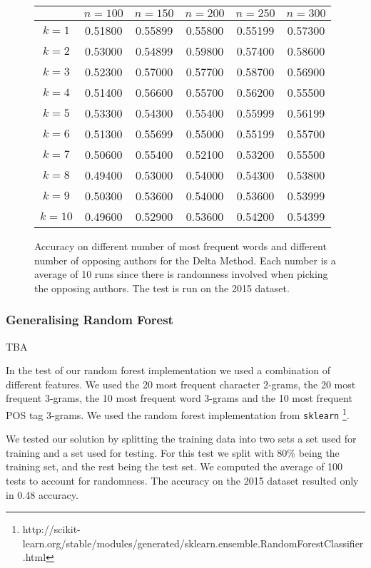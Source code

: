 \begin{figure}
    \centering
    \begin{tabular}{c|ccccc}
               & $n=100$ & $n=150$ & $n=200$ & $n=250$ & $n=300$ \\
        \hline
        $k=1$  & 0.51800 & 0.55899 & 0.55800 & 0.55199 & 0.57300 \\
        $k=2$  & 0.53000 & 0.54899 & 0.59800 & 0.57400 & 0.58600 \\
        $k=3$  & 0.52300 & 0.57000 & 0.57700 & 0.58700 & 0.56900 \\
        $k=4$  & 0.51400 & 0.56600 & 0.55700 & 0.56200 & 0.55500 \\
        $k=5$  & 0.53300 & 0.54300 & 0.55400 & 0.55999 & 0.56199 \\
        $k=6$  & 0.51300 & 0.55699 & 0.55000 & 0.55199 & 0.55700 \\
        $k=7$  & 0.50600 & 0.55400 & 0.52100 & 0.53200 & 0.55500 \\
        $k=8$  & 0.49400 & 0.53000 & 0.54000 & 0.54300 & 0.53800 \\
        $k=9$  & 0.50300 & 0.53600 & 0.54000 & 0.53600 & 0.53999 \\
        $k=10$ & 0.49600 & 0.52900 & 0.53600 & 0.54200 & 0.54399
    \end{tabular}
    \caption{Accuracy on different number of most frequent words and different
        number of opposing authors for the Delta Method. Each number is a
        average of 10 runs since there is randomness involved when picking the
        opposing authors. The test is run on the 2015 dataset.}
    \label{fig:delta_pan_2015_res}
\end{figure}

\subsubsection{Generalising Random Forest}
TBA


In the test of our random forest implementation we used a combination
of different features. We used the 20 most frequent character
2-grams, the 20 most frequent 3-grams, the 10 most frequent
word 3-grams and the 10 most frequent \gls{POS} tag 3-grams.
We used the random forest implementation from \texttt{sklearn}
\footnote{http://scikit-learn.org/stable/modules/generated/sklearn.ensemble.RandomForestClassifier.html}.

We tested our solution by splitting the training data into two sets a set used
for training and a set used for testing. For this test we split with 80\% being
the training set, and the rest being the test set. We computed the average of
100 tests to account for randomness. The accuracy on the 2015 dataset resulted
only in 0.48 accuracy.


